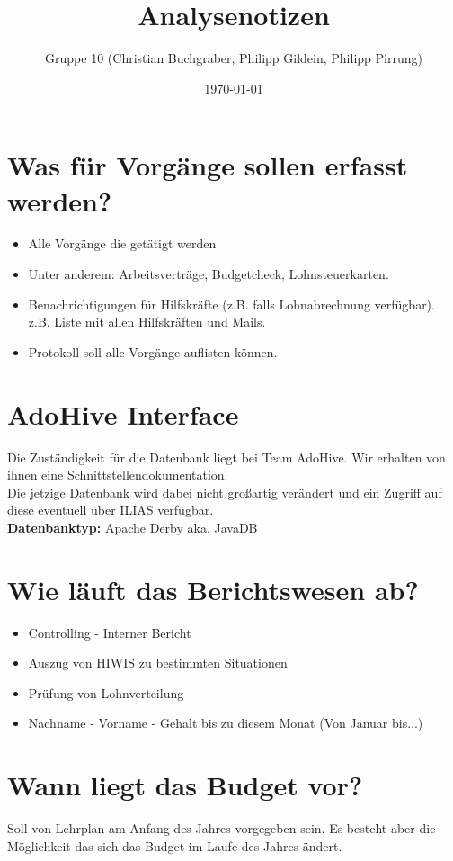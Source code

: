 \documentclass[a4paper]{scrartcl}
\title{Analysenotizen}
\author{Gruppe 10 (Christian Buchgraber, Philipp Gildein, Philipp Pirrung)}
\date{\today}
\begin{document}
    \maketitle
    \pagebreak
    
    \section*{Was für Vorgänge sollen erfasst werden?}
        \begin{itemize}
            \item Alle Vorgänge die getätigt werden
            \item Unter anderem: Arbeitsverträge, Budgetcheck, Lohnsteuerkarten. 
            \item Benachrichtigungen für Hilfskräfte (z.B. falls Lohnabrechnung verfügbar). z.B. Liste mit allen Hilfskräften und Mails.
            \item Protokoll soll alle Vorgänge auflisten können.
        \end{itemize}

    \section*{AdoHive Interface}
         Die Zuständigkeit für die Datenbank liegt bei Team AdoHive. Wir erhalten von ihnen eine Schnittstellendokumentation. \\
         Die jetzige Datenbank wird dabei nicht großartig verändert und ein Zugriff auf diese eventuell über ILIAS verfügbar. \\
         \textbf{Datenbanktyp:} Apache Derby aka. JavaDB

    \section*{Wie läuft das Berichtswesen ab?}
        \begin{itemize}
            \item Controlling - Interner Bericht
            \item Auszug von HIWIS zu bestimmten Situationen
            \item Prüfung von Lohnverteilung
            \item Nachname - Vorname - Gehalt bis zu diesem Monat (Von Januar bis...)
        \end{itemize}

    \section*{Wann liegt das Budget vor?}
        Soll von Lehrplan am Anfang des Jahres vorgegeben sein. Es besteht aber die Möglichkeit das sich das Budget im Laufe des Jahres ändert.
\end{document}
